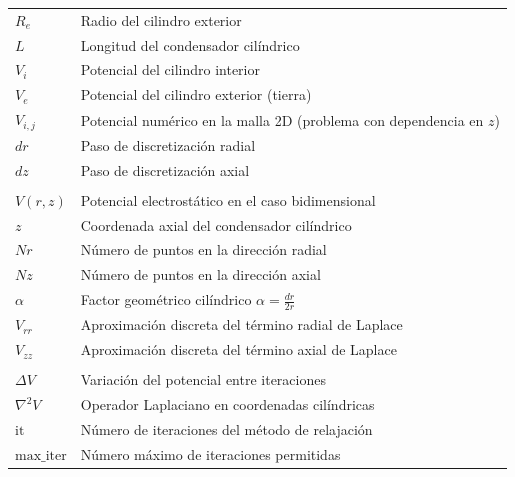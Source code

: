 \documentclass[12pt]{article}
\begin{document}
\begin{center}
\begin{tabular}{ll}
$R_e$ & Radio del cilindro exterior \\

$L$ & Longitud del condensador cilíndrico \\

$V_i$ & Potencial del cilindro interior \\

$V_e$ & Potencial del cilindro exterior (tierra) \\

$V_{i,j}$ & Potencial numérico en la malla 2D (problema con dependencia en $z$) \\

$dr$ & Paso de discretización radial \\

$dz$ & Paso de discretización axial \\

\\
\hline
$V(r,z)$ & Potencial electrostático en el caso bidimensional \\

$z$ & Coordenada axial del condensador cilíndrico \\

$Nr$ & Número de puntos en la dirección radial \\

$Nz$ & Número de puntos en la dirección axial \\

$\alpha$ & Factor geométrico cilíndrico $\alpha = \frac{dr}{2r}$ \\

$V_{rr}$ & Aproximación discreta del término radial de Laplace \\

$V_{zz}$ & Aproximación discreta del término axial de Laplace \\

\\
\hline
$\Delta V$ & Variación del potencial entre iteraciones \\

$\nabla^2 V$ & Operador Laplaciano en coordenadas cilíndricas \\

$\text{it}$ & Número de iteraciones del método de relajación \\

$\text{max\_iter}$ & Número máximo de iteraciones permitidas \\

\hline
\end{tabular}
\end{center}
\end{document}
